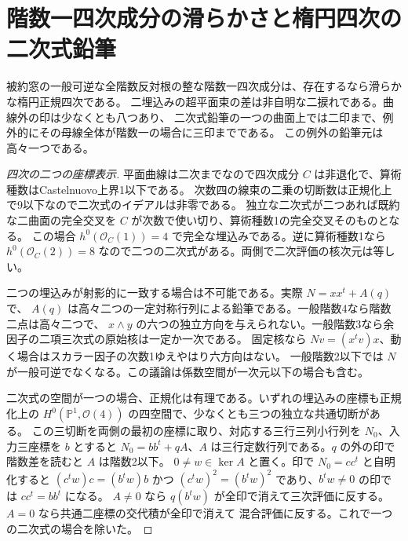 \section{階数一四次成分の滑らかさと楕円四次の二次式鉛筆}
\label{sec:rank-one-quartic-normalization}
\begin{theorem}\label{thm:rank-one-quartic-normalization}
被約窓の一般可逆な全階数反対根の整な階数一四次成分は、存在するなら滑らかな楕円正規四次である。
二埋込みの超平面束の差は非自明な二捩れである。曲線外の印は少なくとも八つあり、
二次式鉛筆の一つの曲面上では二印まで、例外的にその母線全体が階数一の場合に三印までである。
この例外の鉛筆元は高々一つである。
\end{theorem}
\begin{proof}[四次の二つの座標表示]
平面曲線は二次までなので四次成分 $C$ は非退化で、算術種数はCastelnuovo上界1以下である。
次数四の線束の二乗の切断数は正規化上で9以下なので二次式のイデアルは非零である。
独立な二次式が二つあれば既約な二曲面の完全交叉を $C$ が次数で使い切り、算術種数1の完全交叉そのものとなる。
この場合 $h^0(\mathcal O_C(1))=4$ で完全な埋込みである。逆に算術種数1なら
$h^0(\mathcal O_C(2))=8$ なので二つの二次式がある。両側で二次評価の核次元は等しい。

二つの埋込みが射影的に一致する場合は不可能である。実際 $N=xx^t+A(q)$ で、
$A(q)$ は高々二つの一定対称行列による鉛筆である。一般階数4なら階数二点は高々二つで、
$x\wedge y$ の六つの独立方向を与えられない。一般階数3なら余因子の二項三次式の原始核は一定か一次である。
固定核なら $Nv=(x^tv)x$、動く場合はスカラー因子の次数1ゆえやはり六方向はない。
一般階数2以下では $N$ が一般可逆でなくなる。この議論は係数空間が一次元以下の場合も含む。

二次式の空間が一つの場合、正規化は有理である。いずれの埋込みの座標も正規化上の
$H^0(\mathbb P^1,\mathcal O(4))$ の四空間で、少なくとも三つの独立な共通切断がある。
この三切断を両側の最初の座標に取り、対応する三行三列小行列を $N_0$、入力三座標を $b$ とすると
$N_0=bb^t+qA$、$A$ は三行定数行列である。$q$ の外の印で階数差を読むと $A$ は階数2以下。
$0\ne w\in\ker A$ と置く。印で $N_0=cc^t$ と自明化すると $(c^t w)c=(b^tw)b$ かつ
$(c^tw)^2=(b^tw)^2$ であり、$b^tw\ne0$ の印では $cc^t=bb^t$ になる。
$A\ne0$ なら $q(b^tw)$ が全印で消えて三次評価に反する。$A=0$ なら共通二座標の交代積が全印で消えて
混合評価に反する。これで一つの二次式の場合を除いた。
\end{proof}
